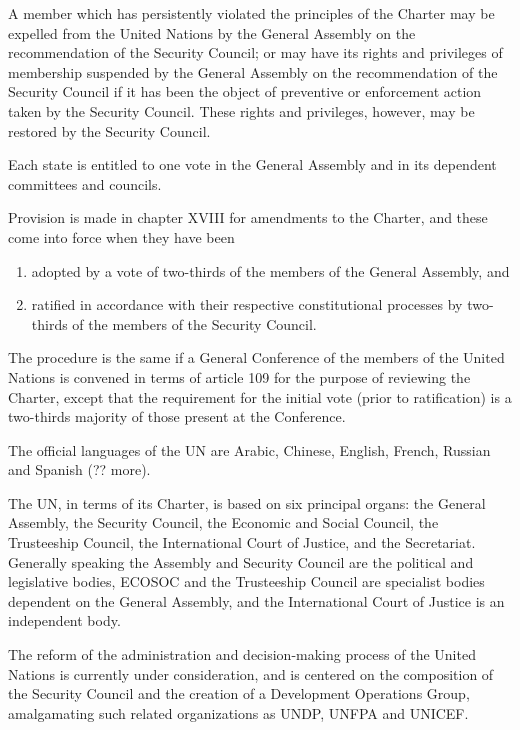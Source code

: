 \documentclass[
  openany]{book}
\providecommand{\tightlist}{%
  \setlength{\itemsep}{0pt}\setlength{\parskip}{0pt}}
\begin{document}
A member which has persistently violated the principles of the Charter may be expelled from the United Nations by the General Assembly on the recommendation of the Security Council; or may have its rights and privileges of membership suspended by the General Assembly on the recommendation of the Security Council if it has been the object of preventive or enforcement action taken by the Security Council. These rights and privileges, however, may be restored by the Security Council.

Each state is entitled to one vote in the General Assembly and in its dependent committees and councils.

Provision is made in chapter XVIII for amendments to the Charter, and these come into force when they have been

\begin{enumerate}
\def\labelenumi{(\alph{enumi})}
\tightlist
\item
  adopted by a vote of two-thirds of the members of the General Assembly, and
\item
  ratified in accordance with their respective constitutional processes by two-thirds of the members of the Security Council.
\end{enumerate}

The procedure is the same if a General Conference of the members of the United Nations is convened in terms of article 109 for the purpose of reviewing the Charter, except that the requirement for the initial vote (prior to ratification) is a two-thirds majority of those present at the Conference.

The official languages of the UN are Arabic, Chinese, English, French, Russian and Spanish (?? more).

The UN, in terms of its Charter, is based on six principal organs: the General Assembly, the Security Council, the Economic and Social Council, the Trusteeship Council, the International Court of Justice, and the Secretariat. Generally speaking the Assembly and Security Council are the political and legislative bodies, ECOSOC and the Trusteeship Council are specialist bodies dependent on the General Assembly, and the International Court of Justice is an independent body.

The reform of the administration and decision-making process of the United Nations is currently under consideration, and is centered on the composition of the Security Council and the creation of a Development Operations Group, amalgamating such related organizations as UNDP, UNFPA and UNICEF.
\end{document}
